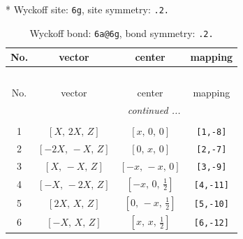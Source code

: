 \documentclass[fleqn,8pt]{jsarticle}
\begin{document}
* Wyckoff site: {\tt 6g}, site symmetry: {\tt .2.}
\renewcommand{\arraystretch}{1.2}
\begin{longtable}{cccc}
\caption{Wyckoff bond: {\tt 6a@6g}, bond symmetry: {\tt .2.}}
 \\
 \hline \hline
No. & vector & center & mapping \\ \hline \endfirsthead

\multicolumn{3}{l}{\tablename\ \thetable{}} \\
 \hline \hline
No. & vector & center & mapping \\ \hline \endhead

 \hline \hline
\multicolumn{3}{r}{\footnotesize\it continued ...} \\ \endfoot

 \hline \hline
\multicolumn{3}{r}{} \\ \endlastfoot

1 & $\left[ X,\, 2 X,\, Z \right]$ & $\left[ x,\, 0,\, 0 \right]$ & {\tt [1,-8]} \\ \hline
2 & $\left[ - 2 X,\, - X,\, Z \right]$ & $\left[ 0,\, x,\, 0 \right]$ & {\tt [2,-7]} \\ \hline
3 & $\left[ X,\, - X,\, Z \right]$ & $\left[ - x,\, - x,\, 0 \right]$ & {\tt [3,-9]} \\ \hline
4 & $\left[ - X,\, - 2 X,\, Z \right]$ & $\left[ - x,\, 0,\, \frac{1}{2} \right]$ & {\tt [4,-11]} \\ \hline
5 & $\left[ 2 X,\, X,\, Z \right]$ & $\left[ 0,\, - x,\, \frac{1}{2} \right]$ & {\tt [5,-10]} \\ \hline
6 & $\left[ - X,\, X,\, Z \right]$ & $\left[ x,\, x,\, \frac{1}{2} \right]$ & {\tt [6,-12]} \\
\end{longtable}
\renewcommand{\arraystretch}{1.2}
\end{document}
